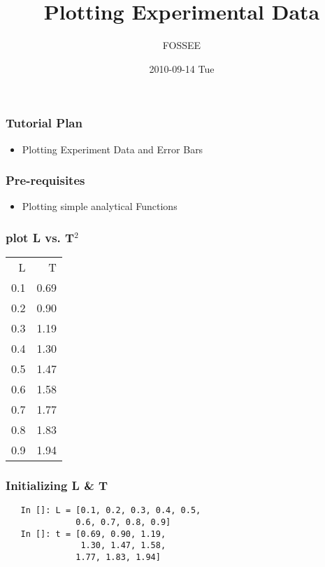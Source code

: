 \documentclass[presentation]{beamer}
\title{Plotting Experimental Data}
\author{FOSSEE}
\date{2010-09-14 Tue}
\begin{document}
\maketitle






\begin{frame}
\frametitle{Tutorial Plan}
\label{sec-1}
\begin{itemize}

\item Plotting Experiment Data and Error Bars\\
\label{sec-1_1}%
\end{itemize} %
\end{frame}
\begin{frame}
\frametitle{Pre-requisites}
\label{sec-2}
\begin{itemize}

\item Plotting simple analytical Functions\\
\label{sec-2_1}%
\end{itemize} %
\end{frame}
\begin{frame}
\frametitle{plot L vs. T$^2$}
\label{sec-3}




\begin{center}
\begin{tabular}{rr}
   L  &     T  \\
 0.1  &  0.69  \\
 0.2  &  0.90  \\
 0.3  &  1.19  \\
 0.4  &  1.30  \\
 0.5  &  1.47  \\
 0.6  &  1.58  \\
 0.7  &  1.77  \\
 0.8  &  1.83  \\
 0.9  &  1.94  \\
\end{tabular}
\end{center}


  
  
\end{frame}
\begin{frame}[fragile]
\frametitle{Initializing L \& T}
\label{sec-4}

\begin{verbatim}
   In []: L = [0.1, 0.2, 0.3, 0.4, 0.5,
              0.6, 0.7, 0.8, 0.9]
   In []: t = [0.69, 0.90, 1.19,
               1.30, 1.47, 1.58,
              1.77, 1.83, 1.94]
\end{verbatim}
\end{frame}
\end{document}

